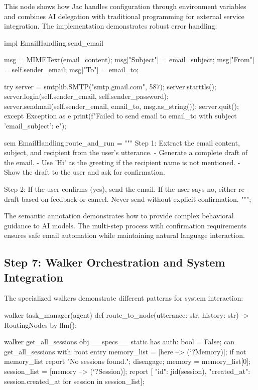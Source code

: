 This node shows how Jac handles configuration through environment variables and combines AI delegation with traditional programming for external service integration. The implementation demonstrates robust error handling:

\begin{jacblock}
impl EmailHandling.send_email {
    msg = MIMEText(email_content);
    msg["Subject"] = email_subject;
    msg["From"] = self.sender_email;
    msg["To"] = email_to;

    try {
        server = smtplib.SMTP("smtp.gmail.com", 587);
        server.starttls();
        server.login(self.sender_email, self.sender_password);
        server.sendmail(self.sender_email, email_to, msg.as_string());
        server.quit();
    }
    except Exception as e {
        print(f"Failed to send email to {email_to} with subject '{email_subject}': {e}");
    }
}

sem EmailHandling.route_and_run = """
Step 1: Extract the email content, subject, and recipient from the user's utterance.
- Generate a complete draft of the email.
- Use 'Hi' as the greeting if the recipient name is not mentioned.
- Show the draft to the user and ask for confirmation.

Step 2: If the user confirms (yes), send the email.
If the user says no, either re-draft based on feedback or cancel.
Never send without explicit confirmation.
""";
\end{jacblock}

The semantic annotation demonstrates how to provide complex behavioral guidance to AI models. The multi-step process with confirmation requirements ensures safe email automation while maintaining natural language interaction.

\subsection{Step 7: Walker Orchestration and System Integration}

The specialized walkers demonstrate different patterns for system interaction:

\begin{jacblock}
walker task_manager(agent) {
    def route_to_node(utterance: str, history: str) -> RoutingNodes by llm();
}

walker get_all_sessions {
    obj __specs__ {
        static has auth: bool = False;
    }
    can get_all_sessions with `root entry {
        memory_list = [here --> (`?Memory)];
        if not memory_list {
            report "No sessions found.";
            disengage;
        }
        memory = memory_list[0];
        session_list = [memory --> (`?Session)];
        report [{
            "id": jid(session),
            "created_at": session.created_at
        } for session in session_list];
    }
}
\end{jacblock}

